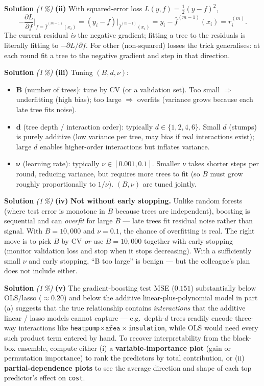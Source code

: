 \documentclass[11pt,a4paper]{article}
\newcommand{\subpoints}[1]{\textit{(#1\,\%)}}
\newcommand{\sol}{\noindent\textbf{Solution}}
\begin{document}
\medskip
\sol{} \subpoints{1} \textbf{(ii)} With squared-error loss $L(y, f) = \tfrac{1}{2}(y-f)^2$,
$$-\frac{\partial L}{\partial f}\bigg|_{f=\hat f^{(m-1)}(x_i)} = (y_i - f)\big|_{\hat f^{(m-1)}(x_i)} = y_i - \hat f^{(m-1)}(x_i) = r_i^{(m)}.$$
The current residual \emph{is} the negative gradient; fitting a tree to the residuals is
literally fitting to $-\partial L/\partial f$. For other (non-squared) losses the trick
generalises: at each round fit a tree to the negative gradient and step in that direction.

\medskip
\sol{} \subpoints{1} \textbf{(iii)} Tuning $(B, d, \nu)$:
\begin{itemize}
  \item $\bm B$ (number of trees): tune by CV (or a validation set). Too small $\Rightarrow$
        underfitting (high bias); too large $\Rightarrow$ overfits (variance grows because each
        late tree fits noise).
  \item $\bm d$ (tree depth / interaction order): typically $d \in \{1, 2, 4, 6\}$. Small
        $d$ (stumps) is purely additive (low variance per tree, may bias if real interactions
        exist); large $d$ enables higher-order interactions but inflates variance.
  \item $\bm \nu$ (learning rate): typically $\nu \in [0.001, 0.1]$. Smaller $\nu$ takes shorter
        steps per round, reducing variance, but requires more trees to fit (so $B$ must grow
        roughly proportionally to $1/\nu$). $(B, \nu)$ are tuned jointly.
\end{itemize}

\medskip
\sol{} \subpoints{1} \textbf{(iv)} \textbf{Not without early stopping.} Unlike random forests (where
test error is monotone in $B$ because trees are independent), boosting is sequential and can
\emph{overfit} for large $B$ --- late trees fit residual noise rather than signal. With
$B=10{,}000$ and $\nu = 0.1$, the chance of overfitting is real. The right move is to pick $B$ by
CV \emph{or} use $B=10{,}000$ together with early stopping (monitor validation loss and stop when
it stops decreasing). With a sufficiently small $\nu$ and early stopping, ``B too large'' is
benign --- but the colleague's plan does not include either.

\medskip
\sol{} \subpoints{1} \textbf{(v)} The gradient-boosting test MSE ($0.151$) substantially below
OLS/lasso ($\approx 0.20$) and below the additive linear-plus-polynomial model in part (a)
suggests that the true relationship contains \emph{interactions} that the additive linear /
lasso models cannot capture --- e.g.\ depth-$d$ trees readily encode three-way interactions like
\texttt{heatpump}$\times\widetilde{\texttt{area}}\times$\texttt{insulation}, while OLS would need
every such product term entered by hand. To recover interpretability from the black-box
ensemble, compute either (i) a \textbf{variable-importance plot} (gain or permutation importance)
to rank the predictors by total contribution, or (ii) \textbf{partial-dependence plots} to see
the average direction and shape of each top predictor's effect on \texttt{cost}.
\end{document}
